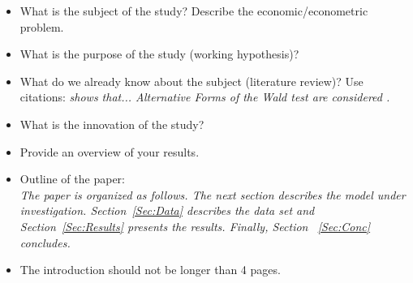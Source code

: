 \begin{itemize}

    \item What is the subject of the study? Describe the
        economic/econometric problem.

    \item What is the purpose of the study (working hypothesis)?

    \item What do we already know about the subject (literature
        review)? Use citations: {\it \cite{Gallant:87} shows that...
        Alternative Forms of the Wald test are considered
        \cite{Breusch&Schmidt:88}.}

    \item What is the innovation of the study?

    \item Provide an overview of your results.


    \item Outline of the paper:\\
        {\it The paper is organized as follows. The next section describes the
        model under investigation. Section~\ref{Sec:Data} describes the data set
        and Section~\ref{Sec:Results} presents the results. Finally, Section
        ~\ref{Sec:Conc} concludes.}

    \item The introduction should not be longer than 4 pages.

\end{itemize}
